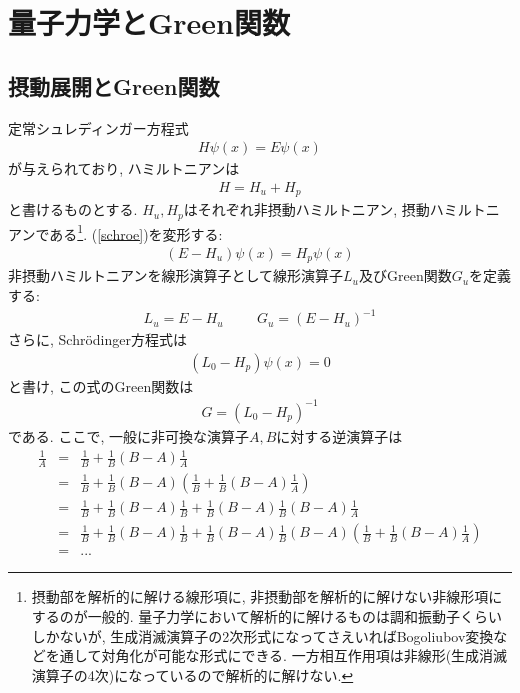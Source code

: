 \documentclass[10.5pt,a4paper]{jreport}
\begin{document}
\section{量子力学とGreen関数}
\subsection{摂動展開とGreen関数}
定常シュレディンガー方程式
\begin{eqnarray}
  H\psi(x) = E\psi(x)\label{schroe}
\end{eqnarray}
が与えられており, ハミルトニアンは
\begin{eqnarray}
  H = H_u + H_p
\end{eqnarray}
と書けるものとする. $H_u, H_p$はそれぞれ非摂動ハミルトニアン, 摂動ハミルトニアンである\footnote{摂動部を解析的に解ける線形項に, 非摂動部を解析的に解けない非線形項にするのが一般的. 量子力学において解析的に解けるものは調和振動子くらいしかないが, 生成消滅演算子の2次形式になってさえいればBogoliubov変換などを通して対角化が可能な形式にできる. 一方相互作用項は非線形(生成消滅演算子の4次)になっているので解析的に解けない.}. (\ref{schroe})を変形する:
\begin{eqnarray}
  (E-H_u)\psi(x) = H_p\psi(x)
\end{eqnarray}
非摂動ハミルトニアンを線形演算子として線形演算子$L_u$及びGreen関数$G_u$を定義する:
\begin{eqnarray}
  L_u = E-H_u\hspace{1cm}G_u = (E-H_u)^{-1}
\end{eqnarray}
さらに, Schr\"odinger方程式は
\begin{eqnarray}
  (L_0-H_p)\psi(x) = 0
\end{eqnarray}
と書け, この式のGreen関数は
\begin{eqnarray}
  G = (L_0 - H_p)^{-1}
\end{eqnarray}
である. ここで, 一般に非可換な演算子$A, B$に対する逆演算子は
\begin{eqnarray}
  \frac{1}{A} &=& \frac{1}{B} + \frac{1}{B}(B-A)\frac{1}{A}\\
  &=& \frac{1}{B} + \frac{1}{B}(B-A)\left(\frac{1}{B} + \frac{1}{B}(B-A)\frac{1}{A}\right)\\
  &=& \frac{1}{B} + \frac{1}{B}(B-A)\frac{1}{B} + \frac{1}{B}(B-A)\frac{1}{B}(B-A)\frac{1}{A}\\
  &=& \frac{1}{B} + \frac{1}{B}(B-A)\frac{1}{B} + \frac{1}{B}(B-A)\frac{1}{B}(B-A)\left(\frac{1}{B} + \frac{1}{B}(B-A)\frac{1}{A}\right)\\
  \nonumber    &=& ...
\end{eqnarray}
\end{document}
